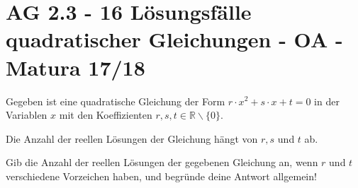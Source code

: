 \section{AG 2.3 - 16 Lösungsfälle quadratischer Gleichungen - OA - Matura 17/18}

\begin{beispiel}[AG 2.3]{1} %
Gegeben ist eine quadratische Gleichung der Form $r\cdot x^2+s\cdot x+t=0$ in der Variablen $x$ mit den Koeffizienten $r,s,t\in\mathbb{R}\backslash\{0\}$.

Die Anzahl der reellen Lösungen der Gleichung hängt von $r,s$ und $t$ ab.

Gib die Anzahl der reellen Lösungen der gegebenen Gleichung an, wenn $r$ und $t$ verschiedene Vorzeichen haben, und begründe deine Antwort allgemein!

\end{beispiel}